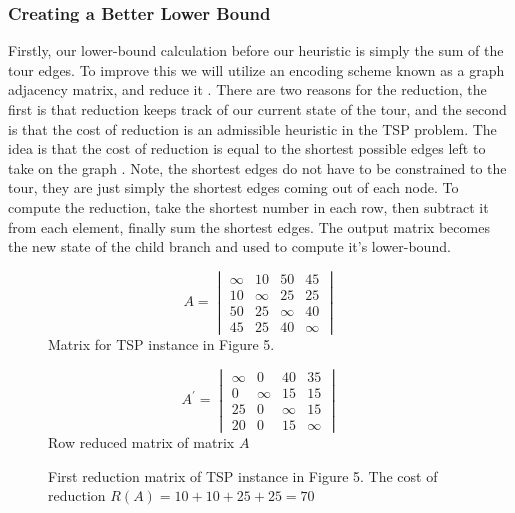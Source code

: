     \subsubsection{Creating a Better Lower Bound}
    Firstly, our lower-bound calculation before our heuristic is simply the sum 
    of the tour edges. To improve this we will utilize an encoding scheme known as 
    a graph adjacency matrix, and reduce it \cite{rastogi2013proposed}. There are two reasons for the reduction, 
    the first is that reduction keeps track of our current state of the tour, and the second
    is that the cost of reduction is an admissible heuristic in the TSP problem.
    The idea is that the cost of reduction is equal to the shortest possible edges left to
    take on the graph \cite{rastogi2013proposed}. Note, the shortest edges do not have to be constrained to the tour, they
    are just simply the shortest edges coming out of each node. To compute the reduction, take the
    shortest number in each row, then subtract it from each element, finally sum the shortest edges.
    The output matrix becomes the new state of the child branch and used to compute it's lower-bound.\\
    
    \begin{figure}[H]
        \begin{minipage}{.5\linewidth}
          \centering
          \begin{equation*}
            A = 
            \begin{vmatrix}
                \infty & 10 & 50 & 45\\
                10 & \infty & 25 & 25 \\
                50 & 25 & \infty & 40 \\
                45 & 25 & 40 & \infty
	        \end{vmatrix}
          \end{equation*}
          Matrix for TSP instance in Figure 5.
        \end{minipage}%
        \begin{minipage}{.5\linewidth}
          \centering
          \begin{equation*}
            A^{'} = 
                \begin{vmatrix}
                    \infty & 0 & 40 & 35\\
                    0 & \infty & 15 & 15 \\
                    25 & 0 & \infty & 15 \\
                    20 & 0 & 15 & \infty
                \end{vmatrix}
            \end{equation*}
          Row reduced matrix of matrix $A$\\
        \end{minipage}
        \caption{First reduction matrix of TSP instance in Figure 5.
                The cost of reduction $ R(A) = 10 + 10 + 25 + 25 = 70$}
      \end{figure}
      


